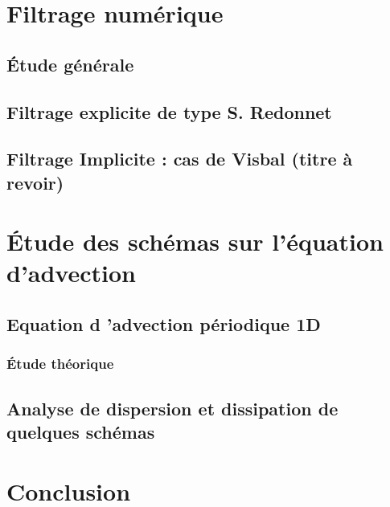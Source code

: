 \section{Filtrage numérique}

\subsection{\'Etude générale}

\subsection{Filtrage explicite de type S. Redonnet}

\subsection{Filtrage Implicite : cas de Visbal (titre à revoir)}


\section{\'Etude des schémas sur l'équation d'advection}

\subsection{Equation d 'advection périodique 1D}

\subsubsection{\'Etude théorique}

\subsection{Analyse de dispersion et dissipation de quelques schémas}

\section{Conclusion}
